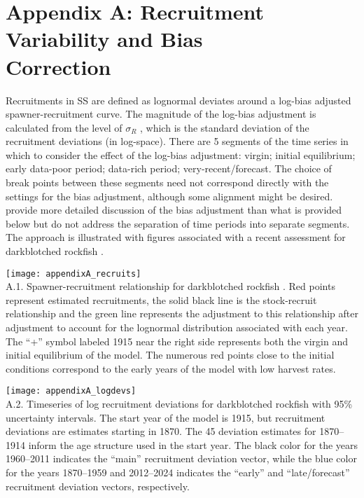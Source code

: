 \section{Appendix A: Recruitment Variability and Bias \\ Correction }


Recruitments in SS are defined as lognormal deviates around a log-bias adjusted spawner-recruitment curve.  The magnitude of the log-bias adjustment is calculated from the level of $\sigma_R$ , which is the standard deviation of the recruitment deviations (in log-space).  There are 5 segments of the time series in which to consider the effect of the log-bias adjustment: virgin; initial equilibrium; early data-poor period; data-rich period; very-recent/forecast. The choice of break points between these segments need not correspond directly with the settings for the bias adjustment, although some alignment might be desired. \citet{methot_adjusting_2011} provide more detailed discussion of the bias adjustment than what is provided below but do not address the separation of time periods into separate segments. The approach is illustrated with figures associated with a recent assessment for darkblotched rockfish \citep{gertseva_status_2013}.

\texttt{[image: appendixA\_recruits]}\\
\figurename{ A.1. Spawner-recruitment relationship for darkblotched rockfish \citep{gertseva_status_2013}. Red points represent estimated recruitments, the solid black line is the stock-recruit relationship and the green line represents the adjustment to this relationship after adjustment to account for the lognormal distribution associated with each year. The “+” symbol labeled 1915 near the right side represents both the virgin and initial equilibrium of the model. The numerous red points close to the initial conditions correspond to the early years of the model with low harvest rates.}

\texttt{[image: appendixA\_logdevs]}\\
\figurename{ A.2. Timeseries of log recruitment deviations for darkblotched rockfish with 95\% uncertainty intervals. The start year of the model is 1915, but recruitment deviations are estimates starting in 1870. The 45 deviation estimates for 1870–1914 inform the age structure used in the start year. The black color for the years 1960–2011 indicates the “main” recruitment deviation vector, while the blue color for the years 1870–1959 and 2012–2024 indicates the “early” and “late/forecast” recruitment deviation vectors, respectively. }

